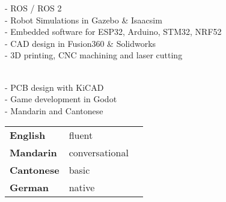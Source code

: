 \documentclass[grey]{hipstercv}
\newlength{\leftcolwidth}
\begin{document}
\begin{paracol}{2}
{ - ROS / ROS 2 \\
 - Robot Simulations in Gazebo \& Isaacsim\\
 - Embedded software for ESP32, Arduino, STM32, NRF52 \\
 - CAD design in Fusion360 \& Solidworks\\
 - 3D printing, CNC machining and laser cutting 

\bigskip


 \\

- PCB design with KiCAD \\
- Game development in Godot \\ 
- Mandarin and Cantonese

\bigskip

\bigskip


\begin{minipage}[t]{\leftcolwidth}
\begin{tabular}{l | ll}
\textbf{English} & {\phantom{x}\footnotesize fluent} \\
\textbf{Mandarin} & {\phantom{x}\footnotesize conversational} \\
\textbf{Cantonese} & {\phantom{x}\footnotesize basic} \\
\textbf{German} & {\phantom{x}\footnotesize native} \\
\end{tabular}
\end{minipage}

\bigskip




 \\

}
\end{paracol}
\end{document}
